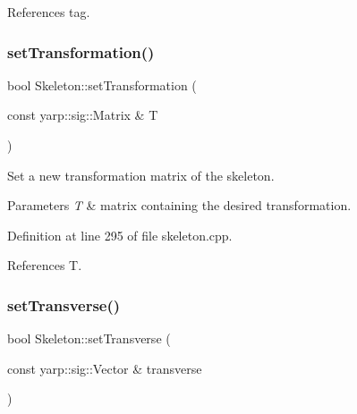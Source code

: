 References tag.

\mbox{\label{classassistive__rehab_1_1Skeleton_a3486cbd7f59e75c1d9ef26cbc05bb72f}} 
\subsubsection{\texorpdfstring{setTransformation()}{setTransformation()}}
{\footnotesize\ttfamily bool Skeleton\+::set\+Transformation (\begin{DoxyParamCaption}\item[{const yarp\+::sig\+::\+Matrix \&}]{T }\end{DoxyParamCaption})}



Set a new transformation matrix of the skeleton. 


\begin{DoxyParams}{Parameters}
{\em T} & matrix containing the desired transformation. \\
\hline
\end{DoxyParams}


Definition at line 295 of file skeleton.\+cpp.


\begin{DoxyCode}{0}

\end{DoxyCode}


References T.

\mbox{\label{classassistive__rehab_1_1Skeleton_a1aeba05a17363afc08c30397d17375df}} 
\subsubsection{\texorpdfstring{setTransverse()}{setTransverse()}}
{\footnotesize\ttfamily bool Skeleton\+::set\+Transverse (\begin{DoxyParamCaption}\item[{const yarp\+::sig\+::\+Vector \&}]{transverse }\end{DoxyParamCaption})}



